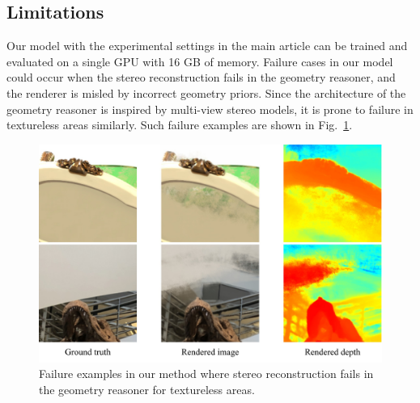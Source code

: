\subsection{Limitations} \label{sec:c3_limitations}
Our model with the experimental settings in the main article can be trained and evaluated on a single GPU with 16 GB of memory. Failure cases in our model could occur when the stereo reconstruction fails in the geometry reasoner, and the renderer is misled by incorrect geometry priors. Since the architecture of the geometry reasoner is inspired by multi-view stereo models, it is prone to failure in textureless areas similarly. Such failure examples are shown in Fig.~\ref{fig:c3_failure}.

\begin{figure}[!t]
	\begin{center}
		\includegraphics[width=1.0\linewidth]{images/chapter3/figures/failure.jpg}
	\end{center}
	\caption{Failure examples in our method where stereo reconstruction fails in the geometry reasoner for textureless areas.}
	\label{fig:c3_failure}
\end{figure}
